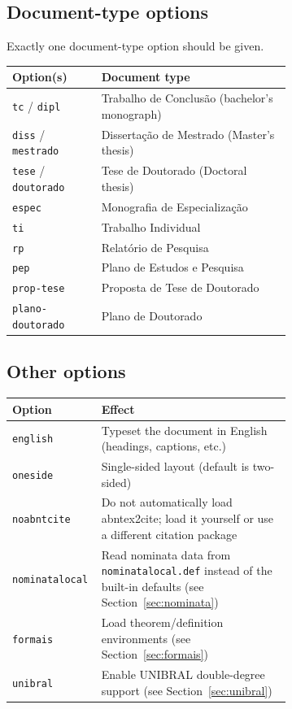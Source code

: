 \documentclass[11pt,a4paper]{article}
\newcommand{\pkg}[1]{\textsf{#1}}
\newcommand{\opt}[1]{\texttt{#1}}
\newcommand{\file}[1]{\texttt{#1}}
\begin{document}
\subsection{Document-type options}
\label{sec:doctypeopts}

Exactly one document-type option should be given.

\begin{center}
\begin{tabular}{@{}lp{0.68\linewidth}@{}}
  \toprule
  Option(s)              & Document type \\
  \midrule
  \opt{tc} / \opt{dipl}             & Trabalho de Conclusão (bachelor's monograph) \\
  \opt{diss} / \opt{mestrado}       & Dissertação de Mestrado (Master's thesis) \\
  \opt{tese} / \opt{doutorado}      & Tese de Doutorado (Doctoral thesis) \\
  \opt{espec}                       & Monografia de Especialização \\
  \opt{ti}                          & Trabalho Individual \\
  \opt{rp}                          & Relatório de Pesquisa \\
  \opt{pep}                         & Plano de Estudos e Pesquisa \\
  \opt{prop-tese}                   & Proposta de Tese de Doutorado \\
  \opt{plano-doutorado}             & Plano de Doutorado \\
  \bottomrule
\end{tabular}
\end{center}

\subsection{Other options}
\label{sec:otheropts}

\begin{center}
\begin{tabular}{@{}lp{0.68\linewidth}@{}}
  \toprule
  Option              & Effect \\
  \midrule
  \opt{english}       & Typeset the document in English (headings, captions, etc.) \\
  \opt{oneside}       & Single-sided layout (default is two-sided) \\
  \opt{noabntcite}    & Do not automatically load \pkg{abntex2cite};
                        load it yourself or use a different citation package \\
  \opt{nominatalocal} & Read nominata data from \file{nominatalocal.def}
                        instead of the built-in defaults
                        (see Section~\ref{sec:nominata}) \\
  \opt{formais}       & Load theorem/definition environments
                        (see Section~\ref{sec:formais}) \\
  \opt{unibral}       & Enable UNIBRAL double-degree support
                        (see Section~\ref{sec:unibral}) \\
  \bottomrule
\end{tabular}
\end{center}
\end{document}
